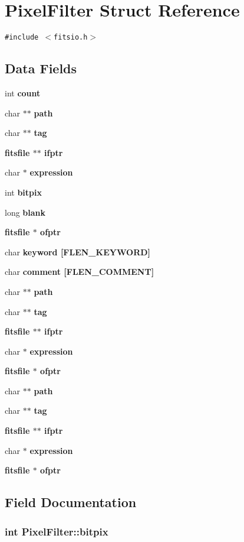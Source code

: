 \section{Pixel\-Filter Struct Reference}
\label{structPixelFilter}
{\tt \#include $<$fitsio.h$>$}

\subsection*{Data Fields}
\begin{CompactItemize}
\item 
int \bf{count}
\item 
char $\ast$$\ast$ \bf{path}
\item 
char $\ast$$\ast$ \bf{tag}
\item 
\bf{fitsfile} $\ast$$\ast$ \bf{ifptr}
\item 
char $\ast$ \bf{expression}
\item 
int \bf{bitpix}
\item 
long \bf{blank}
\item 
\bf{fitsfile} $\ast$ \bf{ofptr}
\item 
char \bf{keyword} [FLEN\_\-KEYWORD]
\item 
char \bf{comment} [FLEN\_\-COMMENT]
\item 
char $\ast$$\ast$ \bf{path}
\item 
char $\ast$$\ast$ \bf{tag}
\item 
\bf{fitsfile} $\ast$$\ast$ \bf{ifptr}
\item 
char $\ast$ \bf{expression}
\item 
\bf{fitsfile} $\ast$ \bf{ofptr}
\item 
char $\ast$$\ast$ \bf{path}
\item 
char $\ast$$\ast$ \bf{tag}
\item 
\bf{fitsfile} $\ast$$\ast$ \bf{ifptr}
\item 
char $\ast$ \bf{expression}
\item 
\bf{fitsfile} $\ast$ \bf{ofptr}
\end{CompactItemize}


\subsection{Field Documentation}
\subsubsection{\setlength{\rightskip}{0pt plus 5cm}int \bf{Pixel\-Filter::bitpix}}\label{structPixelFilter_95dfe3a2d950b0f4d769ad002ff05470}


